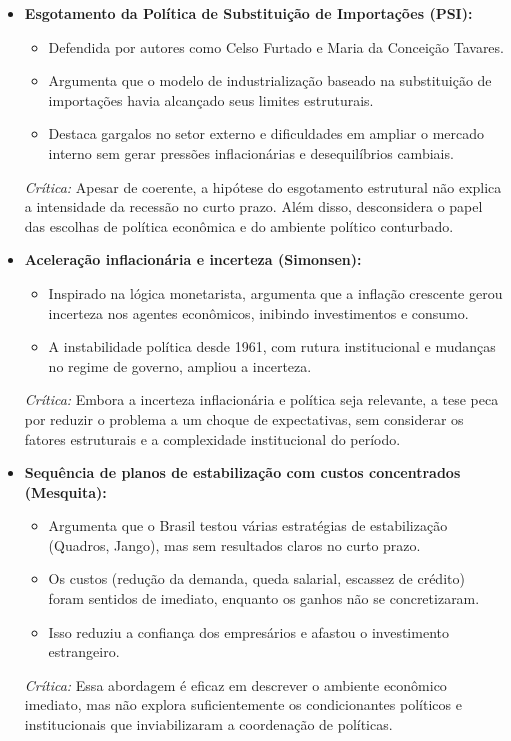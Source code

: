 \documentclass{sciposter}
\begin{document}
\begin{multicols}{3}
\begin{itemize}
    \item \textbf{ Esgotamento da Política de Substituição de Importações (PSI):}
    \begin{itemize}
        \item Defendida por autores como Celso Furtado e Maria da Conceição Tavares.
        \item Argumenta que o modelo de industrialização baseado na substituição de importações havia alcançado seus limites estruturais.
        \item Destaca gargalos no setor externo e dificuldades em ampliar o mercado interno sem gerar pressões inflacionárias e desequilíbrios cambiais.
    \end{itemize}
    \textit{Crítica:} Apesar de coerente, a hipótese do esgotamento estrutural não explica a intensidade da recessão no curto prazo. Além disso, desconsidera o papel das escolhas de política econômica e do ambiente político conturbado.

    \item \textbf{ Aceleração inflacionária e incerteza (Simonsen):}
    \begin{itemize}
        \item Inspirado na lógica monetarista, argumenta que a inflação crescente gerou incerteza nos agentes econômicos, inibindo investimentos e consumo.
        \item A instabilidade política desde 1961, com rutura institucional e mudanças no regime de governo, ampliou a incerteza.
    \end{itemize}
    \textit{Crítica:} Embora a incerteza inflacionária e política seja relevante, a tese peca por reduzir o problema a um choque de expectativas, sem considerar os fatores estruturais e a complexidade institucional do período.

    \item \textbf{ Sequência de planos de estabilização com custos concentrados (Mesquita):}
    \begin{itemize}
        \item Argumenta que o Brasil testou várias estratégias de estabilização (Quadros, Jango), mas sem resultados claros no curto prazo.
        \item Os custos (redução da demanda, queda salarial, escassez de crédito) foram sentidos de imediato, enquanto os ganhos não se concretizaram.
        \item Isso reduziu a confiança dos empresários e afastou o investimento estrangeiro.
    \end{itemize}
    \textit{Crítica:} Essa abordagem é eficaz em descrever o ambiente econômico imediato, mas não explora suficientemente os condicionantes políticos e institucionais que inviabilizaram a coordenação de políticas.


\end{itemize}
\end{multicols}
\end{document}
